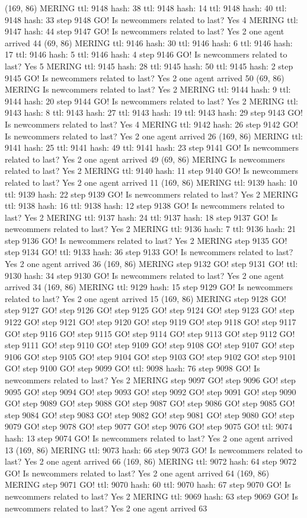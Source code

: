 (169, 86) MERING ttl: 9148 hash: 38 ttl: 9148 hash: 14 ttl: 9148 hash: 40 ttl: 9148 hash: 33 step 9148 GO! Is newcommers related to last? Yes 4 MERING ttl: 9147 hash: 44 step 9147 GO! Is newcommers related to last? Yes 2 one agent arrived 44 (69, 86) MERING ttl: 9146 hash: 30 ttl: 9146 hash: 6 ttl: 9146 hash: 17 ttl: 9146 hash: 5 ttl: 9146 hash: 4 step 9146 GO! Is newcommers related to last? Yes 5 MERING ttl: 9145 hash: 28 ttl: 9145 hash: 50 ttl: 9145 hash: 2 step 9145 GO! Is newcommers related to last? Yes 2 one agent arrived 50 (69, 86) MERING Is newcommers related to last? Yes 2 MERING ttl: 9144 hash: 9 ttl: 9144 hash: 20 step 9144 GO! Is newcommers related to last? Yes 2 MERING ttl: 9143 hash: 8 ttl: 9143 hash: 27 ttl: 9143 hash: 19 ttl: 9143 hash: 29 step 9143 GO! Is newcommers related to last? Yes 4 MERING ttl: 9142 hash: 26 step 9142 GO! Is newcommers related to last? Yes 2 one agent arrived 26 (169, 86) MERING ttl: 9141 hash: 25 ttl: 9141 hash: 49 ttl: 9141 hash: 23 step 9141 GO! Is newcommers related to last? Yes 2 one agent arrived 49 (69, 86) MERING Is newcommers related to last? Yes 2 MERING ttl: 9140 hash: 11 step 9140 GO! Is newcommers related to last? Yes 2 one agent arrived 11 (169, 86) MERING ttl: 9139 hash: 10 ttl: 9139 hash: 22 step 9139 GO! Is newcommers related to last? Yes 2 MERING ttl: 9138 hash: 16 ttl: 9138 hash: 12 step 9138 GO! Is newcommers related to last? Yes 2 MERING ttl: 9137 hash: 24 ttl: 9137 hash: 18 step 9137 GO! Is newcommers related to last? Yes 2 MERING ttl: 9136 hash: 7 ttl: 9136 hash: 21 step 9136 GO! Is newcommers related to last? Yes 2 MERING step 9135 GO! step 9134 GO! ttl: 9133 hash: 36 step 9133 GO! Is newcommers related to last? Yes 2 one agent arrived 36 (169, 86) MERING step 9132 GO! step 9131 GO! ttl: 9130 hash: 34 step 9130 GO! Is newcommers related to last? Yes 2 one agent arrived 34 (169, 86) MERING ttl: 9129 hash: 15 step 9129 GO! Is newcommers related to last? Yes 2 one agent arrived 15 (169, 86) MERING step 9128 GO! step 9127 GO! step 9126 GO! step 9125 GO! step 9124 GO! step 9123 GO! step 9122 GO! step 9121 GO! step 9120 GO! step 9119 GO! step 9118 GO! step 9117 GO! step 9116 GO! step 9115 GO! step 9114 GO! step 9113 GO! step 9112 GO! step 9111 GO! step 9110 GO! step 9109 GO! step 9108 GO! step 9107 GO! step 9106 GO! step 9105 GO! step 9104 GO! step 9103 GO! step 9102 GO! step 9101 GO! step 9100 GO! step 9099 GO! ttl: 9098 hash: 76 step 9098 GO! Is newcommers related to last? Yes 2 MERING step 9097 GO! step 9096 GO! step 9095 GO! step 9094 GO! step 9093 GO! step 9092 GO! step 9091 GO! step 9090 GO! step 9089 GO! step 9088 GO! step 9087 GO! step 9086 GO! step 9085 GO! step 9084 GO! step 9083 GO! step 9082 GO! step 9081 GO! step 9080 GO! step 9079 GO! step 9078 GO! step 9077 GO! step 9076 GO! step 9075 GO! ttl: 9074 hash: 13 step 9074 GO! Is newcommers related to last? Yes 2 one agent arrived 13 (169, 86) MERING ttl: 9073 hash: 66 step 9073 GO! Is newcommers related to last? Yes 2 one agent arrived 66 (169, 86) MERING ttl: 9072 hash: 64 step 9072 GO! Is newcommers related to last? Yes 2 one agent arrived 64 (169, 86) MERING step 9071 GO! ttl: 9070 hash: 60 ttl: 9070 hash: 67 step 9070 GO! Is newcommers related to last? Yes 2 MERING ttl: 9069 hash: 63 step 9069 GO! Is newcommers related to last? Yes 2 one agent arrived 63 